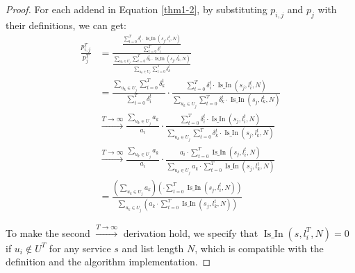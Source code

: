 \begin{proof}
For each addend in Equation \ref{thm1-2}, by substituting $p_{i,j}$ and $p_{j}$ with their definitions, we can get:
\begin{equation}
    \begin{aligned}
    \frac{p_{i,j}^{T}}{p_j^T} &= \frac{\frac{\sum_{t=0}^{T} \delta_{i}^{t} \cdot \operatorname{Is\_In}\left(s_{j}, l_{i}^{t}, N\right)}{\sum_{t=0}^{T} \delta_{i}^{t}}}
    {\frac{\sum_{u_{k} \in U_{j}} \sum_{t=0}^{T} \delta_{k}^{t} \cdot  \operatorname{Is\_In}\left(s_{j}, l_{k}^{t}, N\right)}{\sum_{u_{k} \in U_{j}} \sum_{t=0}^{T} \delta_{k}^{t}}} \\
    &= \frac{{\sum_{u_{k} \in U_{j}} \sum_{t=0}^{T} \delta_{k}^{t}}}{{\sum_{t=0}^{T} \delta_{i}^{t}}}
    \cdot
    \frac{{\sum_{t=0}^{T} \delta_{i}^{t} \cdot \operatorname{Is\_In}\left(s_{j}, l_{i}^{t}, N\right)}}{\sum_{u_{k} \in U_{j}} \sum_{t=0}^{T} \delta_{k}^{t} \cdot  \operatorname{Is\_In}\left(s_{j}, l_{k}^{t}, N\right)} \\
    &\stackrel{{T\rightarrow \infty}}{\longrightarrow} \frac{\sum_{u
    _k \in U_{j}} a_k }{ a_i} \cdot \frac{{\sum_{t=0}^{T} \delta_{i}^{t} \cdot \operatorname{Is\_In}\left(s_{j}, l_{i}^{t}, N\right)}}{\sum_{u_{k} \in U_{j}} \sum_{t=0}^{T} \delta_{k}^{t} \cdot  \operatorname{Is\_In}\left(s_{j}, l_{k}^{t}, N\right)} \\
    &\stackrel{{T\rightarrow \infty}}{\longrightarrow} \frac{\sum_{u
    _k \in U_{j}} a_k }{ a_i}
    \cdot
    \frac{{a_i \cdot \sum_{t=0}^{T} \operatorname{Is\_In}\left(s_{j}, l_{i}^{t}, N\right)}}{\sum_{u_{k} \in U_{j}} a_{k} \cdot  \sum_{t=0}^{T}  \operatorname{Is\_In}\left(s_{j}, l_{k}^{t}, N\right)} \\
    &= \frac{\left(\sum_{u
    _k \in U_{j}} a_k\right) \left(\cdot \sum_{t=0}^{T} \operatorname{Is\_In}\left(s_{j}, l_{i}^{t}, N\right)\right)}{\sum_{u_{k} \in U_{j}} \left(a_{k} \cdot  \sum_{t=0}^{T}  \operatorname{Is\_In}\left(s_{j}, l_{k}^{t}, N\right)\right)}
    \end{aligned}
    \label{thm1-3}
\end{equation}

To make the second $\stackrel{{T\rightarrow \infty}}{\longrightarrow}$ derivation hold, we specify that $\operatorname{Is\_In}\left(s, l_{i}^{T}, N\right) = 0$ if $u_i \notin U^{T}$ for any service $s$ and list length $N$, which is compatible with the definition and the algorithm implementation.


\end{proof}
